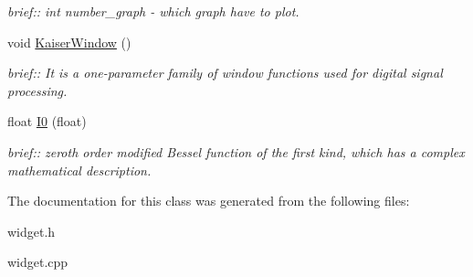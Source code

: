 \begin{DoxyCompactItemize}
\begin{DoxyCompactList}\small\item\em brief\+:\+: int number\+\_\+graph -\/ which graph have to plot. \end{DoxyCompactList}\item 
\hypertarget{classWidget_a80e9384e7e3f3507c654e2a621124060}{}void \hyperlink{classWidget_a80e9384e7e3f3507c654e2a621124060}{Kaiser\+Window} ()\label{classWidget_a80e9384e7e3f3507c654e2a621124060}

\begin{DoxyCompactList}\small\item\em brief\+:\+: It is a one-\/parameter family of window functions used for digital signal processing. \end{DoxyCompactList}\item 
\hypertarget{classWidget_af10aec37d5a2461ef0c4f85bcd36d37b}{}float \hyperlink{classWidget_af10aec37d5a2461ef0c4f85bcd36d37b}{I0} (float)\label{classWidget_af10aec37d5a2461ef0c4f85bcd36d37b}

\begin{DoxyCompactList}\small\item\em brief\+:\+: zeroth order modified Bessel function of the first kind, which has a complex mathematical description. \end{DoxyCompactList}\end{DoxyCompactItemize}


The documentation for this class was generated from the following files\+:\begin{DoxyCompactItemize}
\item 
widget.\+h\item 
widget.\+cpp\end{DoxyCompactItemize}
